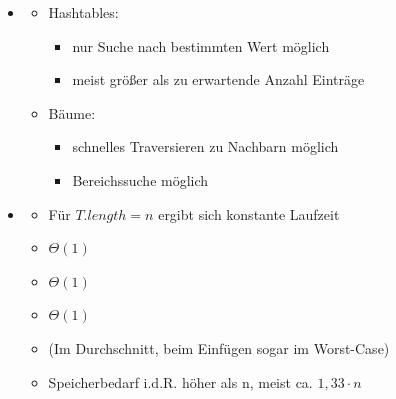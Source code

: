 \documentclass[
    12pt,
    a4paper,
    ngerman,
    color=3b,%
    marginpar=false,
    colorback=false,
    leqno,
]{tudaexercise}
\begin{document}
\begin{itemize}
        \item {}
            \begin{itemize}
                \item Hashtables:
                    \begin{itemize}
                        \item nur Suche nach bestimmten Wert möglich
                        \item meist größer als zu erwartende Anzahl Einträge
                    \end{itemize}
                \item Bäume:
                    \begin{itemize}
                        \item schnelles Traversieren zu Nachbarn möglich
                        \item Bereichssuche möglich
                    \end{itemize}
            \end{itemize}
        
        \item {}
            \begin{itemize}
                \item Für $T.length = n$ ergibt sich konstante Laufzeit
                \item {} $\Theta(1)$
                \item {} $\Theta(1)$
                \item {} $\Theta(1)$
                \item (Im Durchschnitt, beim Einfügen sogar im Worst-Case)
                \item Speicherbedarf i.d.R. höher als n, meist ca. $1,33 \cdot n$
            \end{itemize}
    \end{itemize}
\end{document}
